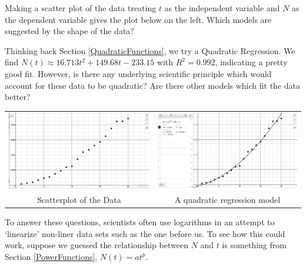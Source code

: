 \documentclass{ximera}
\begin{document}
Making a scatter plot of the data treating $t$ as the independent variable and $N$ as the dependent variable gives the plot below on the left.  Which models are suggested by the shape of the data?  

\smallskip

Thinking back Section \ref{QuadraticFunctions}, we try a Quadratic Regression.  We find $N(t) \approx 16.713 t^2 +149.68t -233.15$ with $R^2 = 0.992$, indicating a pretty good fit.  However, is there any underlying scientific principle which would account for these data to be quadratic?  Are there other models which fit the data  better?


\begin{center}

\begin{tabular}{cc}

\includegraphics[width=3in]{./ApplicationsofExponentialandLogarithmicFunctionsGraphics/ExpLogAppEx04.jpg} &

\includegraphics[width=3in]{./ApplicationsofExponentialandLogarithmicFunctionsGraphics/ExpLogAppEx05.jpg} \\

Scatterplot of the Data &

A quadratic regression model \\

\end{tabular}

\end{center}

To answer these questions, scientists often use logarithms in an attempt to `linearize' non-liner data sets such as the one before us.  To see how this could work, suppose we guessed the relationship between $N$ and $t$ is something from Section \ref{PowerFunctions},  $N(t) = a t^{p}$.  
\end{document}
